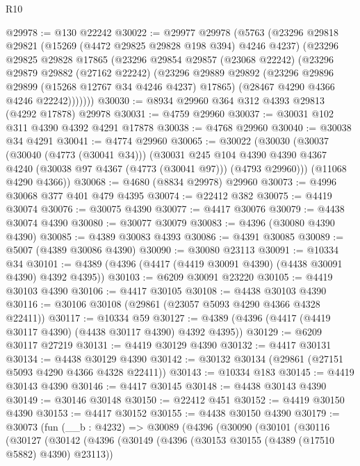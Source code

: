 \begin{lexlean}{R10}
\begin{coremodule}
@29978 := @130 @22242
@30022 := @29977
    @29978
    (@5763
      (@23296
        @29818
        @29821
        (@15269 (@4472 @29825 @29828 @198 @394) @4246 @4237)
        (@23296
          @29825
          @29828
          @17865
          (@23296
            @29854
            @29857
            (@23068 @22242)
            (@23296
              @29879
              @29882
              (@27162 @22242)
              (@23296
                @29889
                @29892
                (@23296 @29896 @29899 (@15268 @12767 @34 @4246 @4237) @17865)
                (@28467 @4290 @4366 @4246 @22242)))))))
@30030 := @8934 @29960 @364 @312 @4393 @29813 (@4292 @17878) @29978
@30031 := @4759 @29960
@30037 := @30031 @102 @311 @4390 @4392 @4291 @17878
@30038 := @4768 @29960
@30040 := @30038 @34 @4291
@30041 := @4774 @29960
@30065 := @30022
    (@30030
      (@30037
        (@30040 (@4773 (@30041 @34)))
        (@30031
          @245
          @104
          @4390
          @4390
          @4367
          @4240
          (@30038 @97 @4367 (@4773 (@30041 @97)))
          (@4793 @29960)))
      (@11068 @4290 @4366))
@30068 := @4680 (@8834 @29978) @29960
@30073 := @4996 @30068 @377 @401 @479 @4395
@30074 := @22412 @382
@30075 := @4419 @30074
@30076 := @30075 @4390
@30077 := @4417 @30076
@30079 := @4438 @30074 @4390
@30080 := @30077 @30079
@30083 := @4396 (@30080 @4390 @4390)
@30085 := @4389 @30083 @4393
@30086 := @4391 @30085
@30089 := @5007 (@4389 @30086 @4390)
@30090 := @30080 @23113
@30091 := @10334 @34
@30101 := @4389 (@4396 (@4417 (@4419 @30091 @4390) (@4438 @30091 @4390) @4392 @4395))
@30103 := @6209 @30091 @23220
@30105 := @4419 @30103 @4390
@30106 := @4417 @30105
@30108 := @4438 @30103 @4390
@30116 := @30106 @30108 (@29861 (@23057 @5093 @4290 @4366 @4328 @22411))
@30117 := @10334 @59
@30127 := @4389 (@4396 (@4417 (@4419 @30117 @4390) (@4438 @30117 @4390) @4392 @4395))
@30129 := @6209 @30117 @27219
@30131 := @4419 @30129 @4390
@30132 := @4417 @30131
@30134 := @4438 @30129 @4390
@30142 := @30132 @30134 (@29861 (@27151 @5093 @4290 @4366 @4328 @22411))
@30143 := @10334 @183
@30145 := @4419 @30143 @4390
@30146 := @4417 @30145
@30148 := @4438 @30143 @4390
@30149 := @30146 @30148
@30150 := @22412 @451
@30152 := @4419 @30150 @4390
@30153 := @4417 @30152
@30155 := @4438 @30150 @4390
@30179 := @30073
    (fun (__b : @4232) =>
    @30089
      (@4396
        (@30090
          (@30101
            (@30116
              (@30127
                (@30142
                  (@4396
                    (@30149
                      (@4396 (@30153 @30155 (@4389 (@17510 @5882) @4390) @23113))

\end{coremodule}
\end{lexlean}
